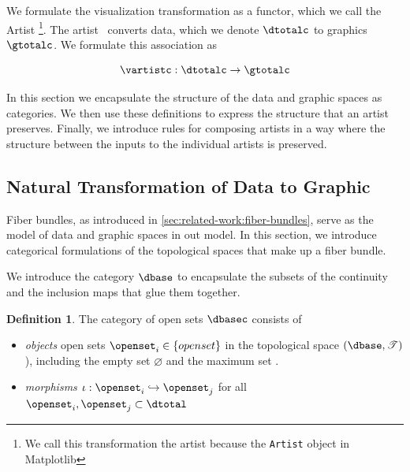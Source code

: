 \documentclass[10pt,journal,compsoc]{IEEEtran}
\theoremstyle{definition}
\newtheorem{definition}{Definition}[section]
\theoremstyle{remark}
\begin{document}
We formulate the visualization transformation as a functor, which we call the \textcolor{artist}{Artist} \vartist \footnote{We call this transformation the artist because the \texttt{Artist} object in Matplotlib\cite{hunterMatplotlib2DGraphics2007}}. The artist \vartist\ converts \textcolor{total}{data}, which we denote $\mathcal{\dtotalc}$ to \textcolor{total}{graphics} $\mathcal{\gtotalc}$. We formulate this association as 

\begin{equation}
  \label{eq:artist:artist}
  \vartistc: \mathcal{\dtotalc} \rightarrow \mathcal{\gtotalc}
\end{equation}

In this section we encapsulate the structure of the data and graphic spaces as categories. We then use these definitions to express the structure that an artist preserves. Finally, we introduce rules for composing artists in a way where the structure between the inputs to the individual artists is preserved. 


\subsection{Natural Transformation of Data to Graphic}
\label{sec:artist:category}

Fiber bundles, as introduced in \autoref{sec:related-work:fiber-bundles}, serve as the model of data and graphic spaces in out model. In this section, we introduce categorical formulations of the topological spaces that make up a fiber bundle. 

We introduce the category $\mathcal{\dbase}$ to encapsulate the subsets of the continuity and the inclusion maps that glue them together. 

\begin{definition} \label{def:category:K} The category of open sets $\mathcal{\dbasec}$ consists of
  \begin{itemize}
    \item \textit{objects} open sets $\openset_{i} \in \{openset\}$ in the topological space $(\dbase, \mathscr{T})$), including the empty set $\varnothing$ and the maximum set \dbase. 
    \item \textit{morphisms} $\iota: \openset_{i} \hookrightarrow \openset_{j}$ for all  $\openset_i, \openset_j \subset \dtotal$
  \end{itemize} 
\end{definition}
\end{document}
